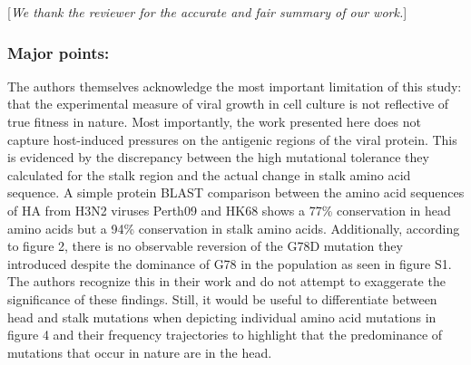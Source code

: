 \documentclass[11pt, oneside]{article}   	%
\newcommand{\comment}[1]{{\color{red}[\textsl{#1}]}}
\begin{document}
\comment{We thank the reviewer for the accurate and fair summary of our work.}

\subsubsection*{Major points:} 

The authors themselves acknowledge the most important limitation of this study: that the experimental measure of viral growth in cell culture is not reflective of true fitness in nature. Most importantly, the work presented here does not capture host-induced pressures on the antigenic regions of the viral protein. This is evidenced by the discrepancy between the high mutational tolerance they calculated for the stalk region and the actual change in stalk amino acid sequence. A simple protein BLAST comparison between the amino acid sequences of HA from H3N2 viruses Perth09 and HK68 shows a 77\% conservation in head amino acids but a 94\% conservation in stalk amino acids. Additionally, according to figure 2, there is no observable reversion of the G78D mutation they introduced despite the dominance of G78 in the population as seen in figure S1. The authors recognize this in their work and do not attempt to exaggerate the significance of these findings. Still, it would be useful to differentiate between head and stalk mutations when depicting individual amino acid mutations in figure 4 and their frequency trajectories to highlight that the predominance of mutations that occur in nature are in the head. 
\end{document}

